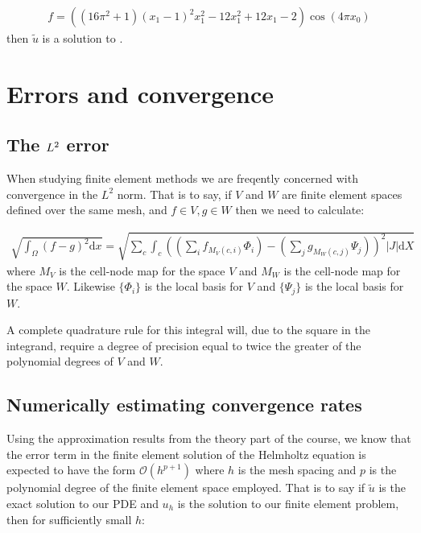 \documentclass{book}
\begin{document}
\label{\detokenize{6_finite_element_problems:equation-f_def}}\begin{equation}\label{equation:6_finite_element_problems:f_def}
\begin{split}f = \left((16 \pi^2 + 1) (x_1 - 1)^2 x_1^2 - 12 x_1^2  +12 x_1  - 2\right) \cos(4 \pi x_0)\end{split}
\end{equation}
then \(\tilde{u}\) is a solution to {\hyperref[\detokenize{6_finite_element_problems:equation-helmholtz}]{}}.


\section{Errors and convergence}
\label{\detokenize{6_finite_element_problems:errors-and-convergence}}

\subsection{The \protect\(L^2\protect\) error}
\label{\detokenize{6_finite_element_problems:the-error}}
When studying finite element methods we are freqently concerned with
convergence in the \(L^2\) norm. That is to say, if \(V\) and \(W\) are
finite element spaces defined over the same mesh, and \(f\in V, g\in W\)
then we need to calculate:

\label{\detokenize{6_finite_element_problems:equation-6_finite_element_problems:13}}\begin{equation}\label{equation:6_finite_element_problems:6_finite_element_problems:13}
\begin{split}\sqrt{\int_\Omega (f-g)^2 \mathrm{d} x} = \sqrt{\sum_c\int_c \left(\left(\sum_i f_{M_V(c,i)}\Phi_i\right) - \left(\sum_j g_{M_W(c,j)}\Psi_j\right)\right)^2|J|\mathrm{d} X}\end{split}
\end{equation}
where \(M_V\) is the cell-node map for the space \(V\) and \(M_W\) is the
cell-node map for the space \(W\). Likewise \(\{\Phi_i\}\) is the local
basis for \(V\) and \(\{\Psi_j\}\) is the local basis for \(W\).

A complete quadrature rule for this integral will, due to the square
in the integrand, require a degree of precision equal to twice the
greater of the polynomial degrees of \(V\) and \(W\).


\subsection{Numerically estimating convergence rates}
\label{\detokenize{6_finite_element_problems:numerically-estimating-convergence-rates}}
Using the approximation results from the theory part of the course, we
know that the error term in the finite element solution of the
Helmholtz equation is expected to have the form \(\mathcal{O}(h^{p+1})\)
where \(h\) is the mesh spacing and \(p\) is the polynomial degree of the
finite element space employed. That is to say if \(\tilde{u}\) is the
exact solution to our PDE and \(u_h\) is the solution to our finite
element problem, then for sufficiently small \(h\):
\end{document}

